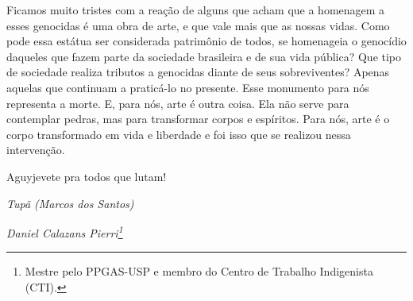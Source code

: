 Ficamos muito tristes com a reação de alguns que acham que a homenagem a
esses genocidas é uma obra de arte, e que vale mais que as nossas
vidas. Como pode essa estátua ser considerada patrimônio de todos, se
homenageia o genocídio daqueles que fazem parte da sociedade brasileira
e de sua vida pública? Que tipo de sociedade realiza tributos a
genocidas diante de seus sobreviventes? Apenas aquelas que continuam a
praticá-lo no presente. Esse monumento para nós representa a morte. E,
para nós, arte é outra coisa. Ela não serve para contemplar pedras,
mas para transformar corpos e espíritos. Para nós, arte é o corpo
transformado em vida e liberdade e foi isso que se realizou nessa
intervenção.

Aguyjevete pra todos que lutam!
\bigskip
\begin{flushright}
\emph{Tupã (Marcos dos Santos)}
\end{flushright}


\begin{flushright}
\emph{Daniel Calazans Pierri\footnote{Mestre pelo PPGAS-USP e membro do
Centro de Trabalho Indigenista (CTI).}}
\end{flushright}
\bigskip

